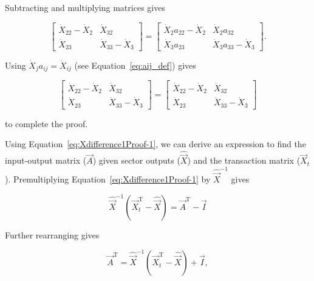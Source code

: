 \noindent Subtracting and multiplying matrices gives

\begin{equation} \label{eq:Xdifference1Proof-3}
	\begin{bmatrix} 	
		\dot{X}_{22} - \dot{X}_{2} & \dot{X}_{32}	\\
		\dot{X}_{23}               & \dot{X}_{33} - \dot{X}_{3}
	\end{bmatrix}
	=
	\begin{bmatrix} 	
		\dot{X}_{2} a_{22} - \dot{X}_{2} & \dot{X}_{2} a_{32}	\\
		\dot{X}_{3} a_{23}               & \dot{X}_{3} a_{33} - \dot{X}_{3}
	\end{bmatrix}.
\end{equation}

\noindent Using $\dot{X}_j a_{ij} = \dot{X}_{ij}$ (see Equation~\ref{eq:aij_def}) gives

\begin{equation} \label{eq:Xdifference1Proof-4}
	\begin{bmatrix} 	
		\dot{X}_{22} - \dot{X}_{2} & \dot{X}_{32}	\\
		\dot{X}_{23}               & \dot{X}_{33} - \dot{X}_{3}
	\end{bmatrix} 
	= 
	\begin{bmatrix} 	
		\dot{X}_{22} - \dot{X}_{2} & \dot{X}_{32}	\\
		\dot{X}_{23}               & \dot{X}_{33} - \dot{X}_{3}
	\end{bmatrix}
\end{equation}

\noindent to complete the proof.

Using Equation~\ref{eq:Xdifference1Proof-1}, 
we can derive an expression to find the input-output matrix ($\vec{A}$)
given sector outputs ($\hat{\vec{X}}$) and the transaction matrix ($\vec{X}_{t}$).
Premultiplying Equation~\ref{eq:Xdifference1Proof-1} by $\hat{\vec{X}}^{-1}$ gives

\begin{equation} \label{eq:Xdifference1Proof-5}
	\hat{\vec{X}}^{-1}
	\left( 
		\vec{X}_{t}^\mathrm{T} 
		- \hat{\vec{X}} 
	\right)
	= \vec{A}^\mathrm{T} - \vec{I}
\end{equation}

\noindent{}Further rearranging gives

\begin{equation}\label{eq:Xdifference1Proof-6}
	\vec{A}^\mathrm{T} 
	= \hat{\vec{X}}^{-1}
	\left( 
		\vec{X}_{t}^\mathrm{T} 
		- \hat{\vec{X}} 
	\right)
	+ \vec{I},
\end{equation}

